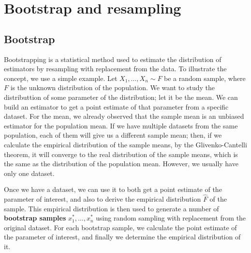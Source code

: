 \section{Bootstrap and resampling}

\subsection{Bootstrap}

Bootstrapping is a statistical method used to estimate the distribution of estimators by resampling with replacement from the data. To illustrate the concept, we use a simple example. Let $X_1, \ldots, X_n \sim F$ be a random sample, where $F$ is the unknown distribution of the population. We want to study the distributtion of some parameter of the distribution; let it be the mean. We can build an estimator to get a point estimate of that parameter from a specific dataset. For the mean, we already observed that the sample mean is an unbiased estimator for the population mean. If we have multiple datasets from the same population, each of them will give us a different sample mean; then, if we calculate the empirical distribution of the sample means, by the Glivenko-Cantelli theorem, it will converge to the real distribution of the sample means, which is the same as the distribution of the population mean. However, we usually have only one dataset.

Once we have a dataset, we can use it to both get a point estimate of the parameter of interest, and also to derive the empirical distribution $\hat{F}$ of the sample. This empirical distribution is then used to generate a number of \textbf{bootstrap samples} $x_1^*, \ldots, x_n^*$ using random sampling with replacement from the original dataset. For each bootstrap sample, we calculate the point estimate of the parameter of interest, and finally we determine the empirical distribution of it.

